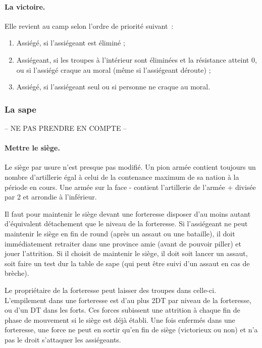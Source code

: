 \paragraph{La victoire.} Elle revient au camp selon l'ordre de priorité suivant~:
\begin{enumerate}
\item Assiégé, si l'assiégeant est éliminé ;
\item Assiégeant, si les troupes à l'intérieur sont éliminées et la résistance atteint 0,
ou si l'assiégé craque au moral
(même si l'assiégeant déroute) ;
\item Assiégé, si l'assiégeant seul ou si personne ne craque au moral.
\end{enumerate}


\subsubsection{La sape}
-- NE PAS PRENDRE EN COMPTE --

\paragraph{Mettre le siège.}
Le siège par usure n'est presque pas modifié. Un pion armée  contient toujours
un nombre d'artillerie égal à celui de la contenance maximum de sa nation à la période en cours.
Une armée sur la face - contient l'artillerie de l'armée + divisée par 2 et arrondie
à l'inférieur.

Il faut pour maintenir le siège devant une forteresse disposer d'au moins autant
d'équivalent détachement que le niveau de la forteresse.
Si l'assiégeant ne peut maintenir le siège en fin de round (après un assaut ou une
bataille), il doit immédiatement retraiter dans une province amie (avant de pouvoir
piller) et jouer l'attrition.
Si il choisit de maintenir le siège, il doit soit lancer un assaut, soit faire
un test dur la table de sape (qui peut être suivi d'un assaut en cas de brèche).

Le propriétaire de la forteresse peut laisser des troupes dans celle-ci.
L'empilement dans une forteresse est d'au plus 2DT par niveau de la
forteresse, ou d'un DT dans les forts. Ces forces subissent une attrition
à chaque fin de phase de mouvement si le siège est déjà
établi. Une fois enfermés dans une forteresse, une force ne peut
en sortir qu'en fin de siège (victorieux ou non) et n'a pas le
droit s'attaquer les assiégeants.

